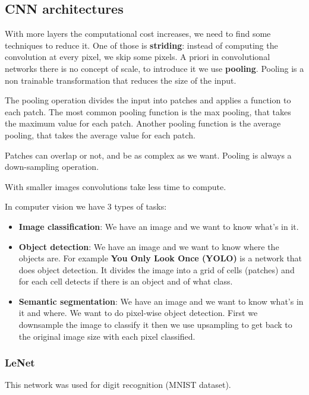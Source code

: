 \subsection{CNN architectures}
\label{sec:cnn_architectures}

With more layers the computational cost increases, we need to find some techniques to reduce it.
One of those is \textbf{striding}: instead of computing the convolution at every pixel, we skip some pixels.
A priori in convolutional networks there is no concept of scale, to introduce it we use \textbf{pooling}.
Pooling is a non trainable transformation that reduces the size of the input.

The pooling operation divides the input into patches and applies a function to each patch.
The most common pooling function is the max pooling, that takes the maximum value for each patch.
Another pooling function is the average pooling, that takes the average value for each patch.

Patches can overlap or not, and be as complex as we want.
Pooling is always a down-sampling operation.

With smaller images convolutions take less time to compute.

In computer vision we have 3 types of tasks:

\begin{itemize}
    \item \textbf{Image classification}: We have an image and we want to know what's in it.
    \item \textbf{Object detection}: We have an image and we want to know where the objects are. 
    For example \textbf{You Only Look Once (YOLO)} is a network that does object detection.
    It divides the image into a grid of cells (patches) and for each cell detects if there is an object and of what class.
    \item \textbf{Semantic segmentation}: We have an image and we want to know what's in it and where.
    We want to do pixel-wise object detection. First we downsample the image to classify it then we use 
    upsampling to get back to the original image size with each pixel classified.
\end{itemize}

\subsubsection{LeNet}
\label{sec:lenet}

This network was used for digit recognition (MNIST dataset).

